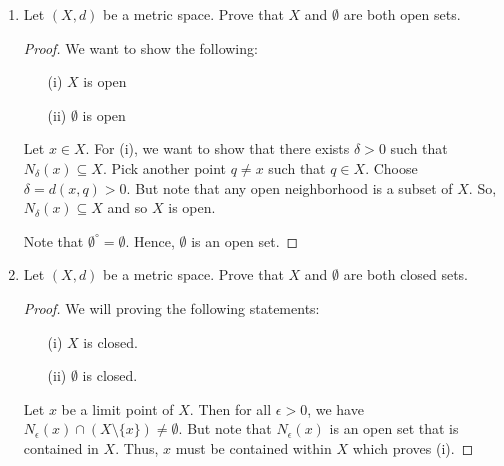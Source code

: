 \documentclass[a4paper]{article}
\begin{document}
\begin{enumerate}
\begin{proof}
            Thus, we conclude that 
            \[  E' = \{ (a,b) \in \R^{2} : a^{2} + b^{2} \leq 4  \}. \]
        \end{proof}
    \item Let \( (X,d)  \) be a metric space. Prove that \( X  \) and \( \emptyset  \) are both open sets.
        \begin{proof}
        We want to show the following: 
        \begin{enumerate}
            \item[(i)] \( X  \) is open 
            \item[(ii)] \( \emptyset \) is open
        \end{enumerate}
        Let \( x \in X \). For (i), we want to show that there exists \( \delta > 0 \) such that \( {N}_{\delta}(x) \subseteq X  \). Pick another point \( q \neq x  \) such that \( q \in X  \). Choose \( \delta =  d(x,q) > 0 \). But note that any open neighborhood is a subset of \( X  \). So, \( {N}_{\delta}(x) \subseteq X  \) and so \( X  \) is open. 
        
        Note that \( \emptyset^{\circ} = \emptyset \). Hence, \( \emptyset  \) is an open set.
        \end{proof}
    \item Let \( (X,d)  \) be a metric space. Prove that \( X  \) and \( \emptyset  \) are both closed sets.
        \begin{proof}
        We will proving the following statements: 
        \begin{enumerate}
            \item[(i)] \( X  \) is closed.
            \item[(ii)] \( \emptyset \) is closed.
        \end{enumerate}
        Let \( x  \) be a limit point of \( X  \). Then for all \( \epsilon > 0 \), we have \( {N}_{\epsilon}(x) \cap (X \setminus  \{ x \} ) \neq \emptyset  \). But note that \( {N}_{\epsilon}(x) \) is an open set that is contained in \( X  \). Thus, \( x  \) must be contained within \( X  \) which proves (i).


\end{proof}
\end{enumerate}
\end{document}
